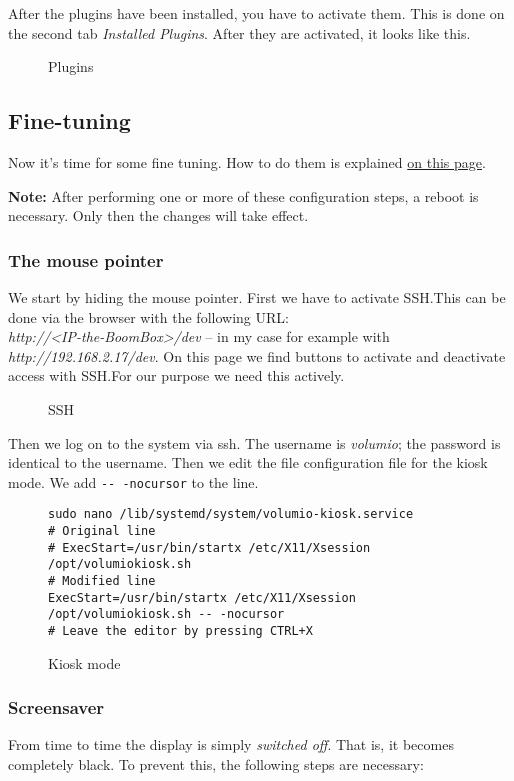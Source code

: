 \documentclass[12pt,a4paper]{article}
\newcommand{\code}[1]{\texttt{#1}}
\newcommand{\jpaimg}[2]{\begin{figure}[H]\centering\fbox{\texttt{[image: \#1]}}\caption{#2}\label{fig:#2}\end{figure}}
\begin{document}
After the plugins have been installed, you have to activate them. This is done on the second tab \textit{Installed Plugins}. After they are activated, it
looks like this.

\jpaimg{./../images/vol-plug-active.png}{Plugins}

\subsection{Fine-tuning}\label{subsec:Fine-tuning}
Now it's time for some fine tuning. How to do them is explained
\href{https://volumio.org/forum/guide-for-setting-touchscreen-backlight-control-t11425.html}{on this page}.

\textbf{Note:} After performing one or more of these configuration steps, a reboot is necessary. Only then the changes will take effect.

\subsubsection{The mouse pointer}\label{subsubsec:SSH}
We start by hiding the mouse pointer. First we have to activate SSH.\@ This can be done via the browser with the following URL:\@ \\
\textit{http://<IP-the-BoomBox>/dev} -- in my case for example with \\ \textit{http://192.168.2.17/dev}. On this page we find buttons to activate and
de\-activate access with SSH.\@ For our purpose we need this actively.

\jpaimg{./../images/vol-dev.png}{SSH}

Then we log on to the system via ssh. The username is \textit{volumio}; the password is identical to the username. Then we edit the file configuration file for
the kiosk mode. We add \code{-{}- -nocursor} to the line.

\begin{figure}[H]
\begin{lstlisting}
sudo nano /lib/systemd/system/volumio-kiosk.service
# Original line
# ExecStart=/usr/bin/startx /etc/X11/Xsession /opt/volumiokiosk.sh
# Modified line
ExecStart=/usr/bin/startx /etc/X11/Xsession /opt/volumiokiosk.sh -- -nocursor
# Leave the editor by pressing CTRL+X
\end{lstlisting}
\caption{Kiosk mode}\label{fig:Kiosk mode}
\end{figure}

\subsubsection{Screensaver}
From time to time the display is simply \textit{switched off}. That is, it becomes completely black. To prevent this, the following steps are necessary:
\end{document}
